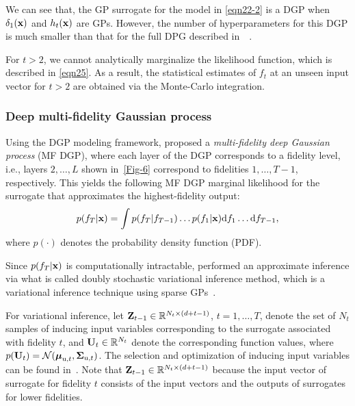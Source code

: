 \documentclass[iicol,sn-basic]{sn-jnl}%
\begin{document}
We can see that, the GP surrogate for the model in \cref{eqn22-2} is a DGP when $\delta_1(\bf x)$ and $h_{t}(\bf x)$ are GPs.
However, the number of hyperparameters for this DGP is much smaller than that for the full DPG described in~~\citep{Perdikaris2017}. 
  
For $t>2$, we cannot analytically marginalize the likelihood function, which is described in \cref{eqn25}.
As a result, the statistical estimates of $f_{t}$ at an unseen input vector for $t>2$ are obtained via the Monte-Carlo integration.

\subsubsection{Deep multi-fidelity Gaussian process}\label{Sec453}

Using the DGP modeling framework, \cite{Cutajar2019} proposed a \textit{multi-fidelity deep Gaussian process} (MF DGP),
where each layer of the DGP corresponds to a fidelity level, i.e., layers $2,\dots,L$ shown in~\cref{Fig-6}
correspond to fidelities $1,\dots,T-1$, respectively.
This yields the following MF DGP marginal likelihood for the surrogate that approximates the highest-fidelity output:
\begin{equation}\label{eqn25}
	p(f_{T}|{\bf x}) = \int p(f_{T}|f_{T-1})\dots p(f_{1}|{\bf x}) \text{d}f_{1} \dots \text{d}f_{T-1},
\end{equation}
where $p(\cdot)$ denotes the probability density function (PDF).

Since $p(f_{T}|{\bf x})$ is computationally intractable, \cite{Cutajar2019} performed an approximate inference via what is called doubly stochastic variational inference method, which is a variational inference technique using sparse GPs~\citep{Salimbeni2017}.

For variational inference, let  ${\bf Z}_{t-1} \in \mathbb{R}^{N_t \times {(d+t-1)}}$, $t=1,\dots,T$, denote the set of $N_t$ samples of inducing input variables corresponding to the surrogate associated with fidelity $t$, and ${\bf U}_{t} \in \mathbb{R}^{N_t}$ denote the corresponding function values, where $p({\bf U}_{t}) = \mathcal{N}({\boldsymbol \mu}_{\text{u},t},{\boldsymbol \Sigma}_{\text{u},t})$.
The selection and optimization of inducing input variables can be found in~\cite{Titsias2009}.
Note that ${\bf Z}_{t-1} \in \mathbb{R}^{N_t \times {(d+t-1)}}$ because the input vector of surrogate for fidelity $t$ consists of the input vectors and the outputs of surrogates for lower fidelities.
\end{document}
